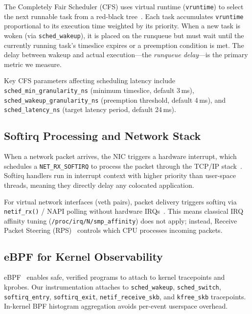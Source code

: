 \documentclass[11pt,a4paper]{article}
\begin{document}
The Completely Fair Scheduler (CFS) uses virtual runtime (\texttt{vruntime}) to select the next runnable task from a red-black tree~\cite{fleming2017cfs}. Each task accumulates \texttt{vruntime} proportional to its execution time weighted by its priority. When a new task is woken (via \texttt{sched\_wakeup}), it is placed on the runqueue but must wait until the currently running task's timeslice expires or a preemption condition is met. The delay between wakeup and actual execution---the \emph{runqueue delay}---is the primary metric we measure.

Key CFS parameters affecting scheduling latency include \texttt{sched\_min\_granularity\_ns} (minimum timeslice, default 3\,ms), \texttt{sched\_wakeup\_granularity\_ns} (preemption threshold, default 4\,ms), and \texttt{sched\_latency\_ns} (target latency period, default 24\,ms).

\subsection{Softirq Processing and Network Stack}

When a network packet arrives, the NIC triggers a hardware interrupt, which schedules a \texttt{NET\_RX\_SOFTIRQ} to process the packet through the TCP/IP stack~\cite{mogul1996eliminating}. Softirq handlers run in interrupt context with higher priority than user-space threads, meaning they directly delay any colocated application.

For virtual network interfaces (veth pairs), packet delivery triggers softirq via \texttt{netif\_rx()} / NAPI polling without hardware IRQs~\cite{salim2001napi}. This means classical IRQ affinity tuning (\texttt{/proc/irq/N/smp\_affinity}) does not apply; instead, Receive Packet Steering (RPS)~\cite{rps2010} controls which CPU processes incoming packets.

\subsection{eBPF for Kernel Observability}

eBPF~\cite{starovoitov2014ebpf, brendangregg2019bpf} enables safe, verified programs to attach to kernel tracepoints and kprobes. Our instrumentation attaches to \texttt{sched\_wakeup}, \texttt{sched\_switch}, \texttt{softirq\_entry}, \texttt{softirq\_exit}, \texttt{netif\_receive\_skb}, and \texttt{kfree\_skb} tracepoints. In-kernel BPF histogram aggregation avoids per-event userspace overhead.
\end{document}
